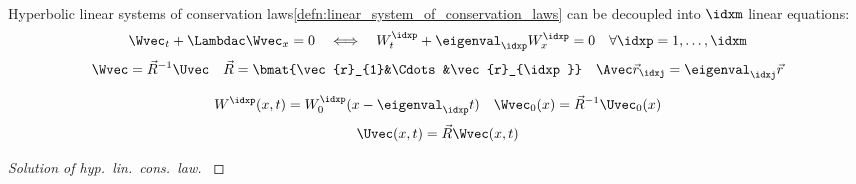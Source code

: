 \begin{propositionbox}\nospacing
    \begin{proposition} \label{proposition:decoupled_hyperbolic_lin._cons._law}\leavevmode\\
        Hyperbolic linear systems of conservation laws\cref{defn:linear_system_of_conservation_laws} can be decoupled into $\idxm$
        linear equations:
        \begin{align*}
          \Wvec_{t}+\Lambdac\Wvec_{x}=0&&\iff&&W_{t}^{\idxp}+\eigenval_{\idxp}W_{x}^{\idxp}=0\quad\forall\idxp=1,\ldots,\idxm
        \end{align*}
        \begin{align}
          \Wvec=\vec{R}^{-1}\Uvec&&\vec{R}=\bmat{\vec{r}_{1}&\Cdots&\vec{r}_{\idxp}}&&\Avec\vec{r}_{\idxj}=\eigenval_{\idxj}\vec{r}\label{eq:decoupled_hyperbolic_conservation_law}
        \end{align}
    \end{proposition}
\end{propositionbox}
\begin{corbox}\nospacing
    \begin{cor}\label{cor:solution_of_hyp_lin_cons_laws}
        \begin{align}
          W^{\idxp}(x,t)=W_{0}^{\idxp}(x-\eigenval_{\idxp}t)&&\Wvec_{0}(x)=\vec{R}^{-1}\Uvec_{0}(x)
        \end{align}
        \begin{align}
          \Uvec(x,t)=\vec{R}\Wvec(x,t)
        \end{align}
    \end{cor}
\end{corbox}
\begin{proofbox}\nospacing
    \begin{proof}[Solution of hyp.\ lin.\ cons.\ law]\label{proof:cor:solution_of_hyp_lin_cons_laws}
    \end{proof}
\end{proofbox}

